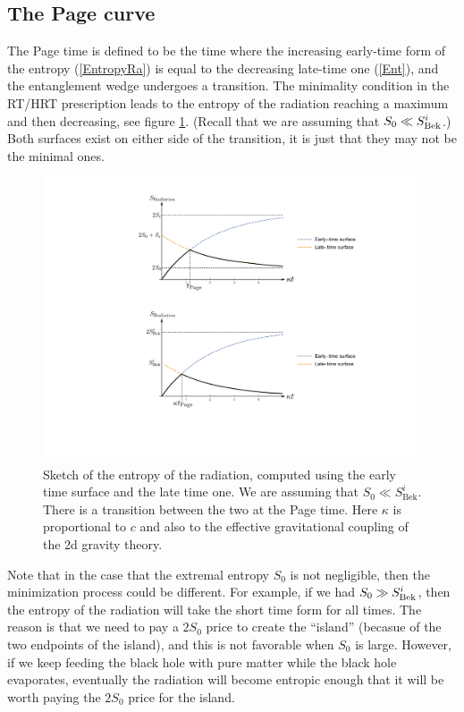 \documentclass[11pt]{article}
\def\nref#1{(\ref{#1})}
\begin{document}
\subsection{The Page curve}
The Page time \cite{Page:1993wv} is defined to be the time where the increasing early-time form of the entropy \nref{EntropyRa} is equal to the decreasing late-time one \nref{Ent}, and the entanglement wedge undergoes a transition.
The minimality condition in the RT/HRT prescription leads to the entropy of the radiation reaching a maximum and then decreasing, see figure \ref{BHEnt}. 
(Recall that we are assuming that $S_0 \ll S^i_{\rm Bek}$.)
Both surfaces exist on either side of the transition, it is just that they may not be the minimal ones.

\begin{figure}[ht]
    \begin{center}
    \includegraphics[scale=.7]{Figures/RadEnt}
    \end{center}
    \caption{Sketch of the entropy of the radiation, computed using the early time surface and the late time one. 
    We are assuming that $S_0 \ll S^i_\text{Bek}$. 
    There is a transition between the two at the Page time.
    Here $\kappa$ is proportional to $c$ and also to the effective gravitational coupling of the 2d gravity theory.}
    \label{BHEnt}
\end{figure}

Note that in the case that the extremal entropy $S_0$ is not negligible, then the minimization process could be different. 
For example, if we had $S_0 \gg S^i_{\rm Bek}$, then the entropy of the radiation will take the short time form for all times.
The reason is that we need to pay a $2S_0$ price to create the ``island'' (becasue of the two endpoints of the island), and this is not favorable when $S_0$ is large.
However, if we keep feeding the black hole with pure matter while the black hole evaporates, eventually the radiation will become entropic enough that it will be worth paying the $2 S_0$ price for the island.
\end{document}
